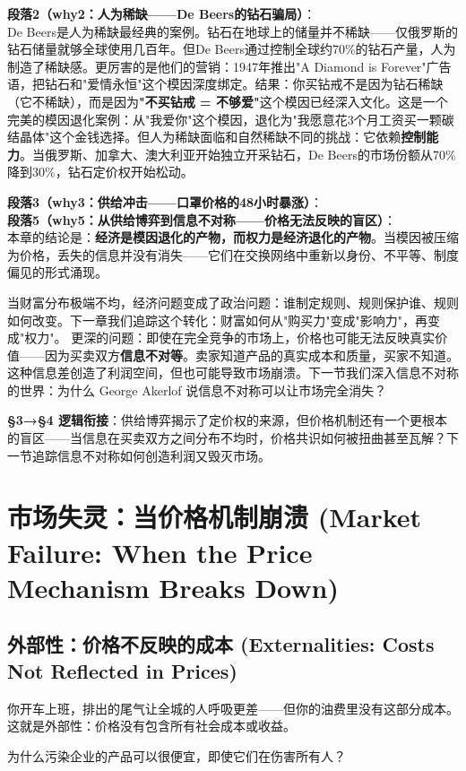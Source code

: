 \documentclass[../main.tex]{subfiles}
\begin{document}
	\textbf{段落2（why2：人为稀缺——De Beers的钻石骗局）}：\\
	De Beers是人为稀缺最经典的案例。钻石在地球上的储量并不稀缺——仅俄罗斯的钻石储量就够全球使用几百年。但De Beers通过控制全球约70\%的钻石产量，人为制造了稀缺感。更厉害的是他们的营销：1947年推出"A Diamond is Forever"广告语，把钻石和"爱情永恒"这个模因深度绑定。结果：你买钻戒不是因为钻石稀缺（它不稀缺），而是因为\textbf{"不买钻戒 = 不够爱"}这个模因已经深入文化。这是一个完美的模因退化案例：从"我爱你"这个模因，退化为"我愿意花3个月工资买一颗碳结晶体"这个金钱选择。但人为稀缺面临和自然稀缺不同的挑战：它依赖\textbf{控制能力}。当俄罗斯、加拿大、澳大利亚开始独立开采钻石，De Beers的市场份额从70\%降到30\%，钻石定价权开始松动。

	\textbf{段落3（why3：供给冲击——口罩价格的48小时暴涨）}：\\
	\textbf{段落5（why5：从供给博弈到信息不对称——价格无法反映的盲区）}：\\
	本章的结论是：\textbf{经济是模因退化的产物，而权力是经济退化的产物}。当模因被压缩为价格，丢失的信息并没有消失——它们在交换网络中重新以身份、不平等、制度偏见的形式涌现。

	当财富分布极端不均，经济问题变成了政治问题：谁制定规则、规则保护谁、规则如何改变。下一章我们追踪这个转化：财富如何从"购买力"变成"影响力"，再变成"权力"。
	更深的问题：即使在完全竞争的市场上，价格也可能无法反映真实价值——因为买卖双方\textbf{信息不对等}。卖家知道产品的真实成本和质量，买家不知道。这种信息差创造了利润空间，但也可能导致市场崩溃。下一节我们深入信息不对称的世界：为什么 George Akerlof 说信息不对称可以让市场完全消失？

	\textbf{§3→§4 逻辑衔接}：供给博弈揭示了定价权的来源，但价格机制还有一个更根本的盲区——当信息在买卖双方之间分布不均时，价格共识如何被扭曲甚至瓦解？下一节追踪信息不对称如何创造利润又毁灭市场。

	\section{市场失灵：当价格机制崩溃 (Market Failure: When the Price Mechanism Breaks Down)}

	\subsection{外部性：价格不反映的成本 (Externalities: Costs Not Reflected in Prices)}
	\begin{motivation}
		你开车上班，排出的尾气让全城的人呼吸更差——但你的油费里没有这部分成本。这就是外部性：价格没有包含所有社会成本或收益。
	\end{motivation}
	\begin{questionbox}
		为什么污染企业的产品可以很便宜，即使它们在伤害所有人？
	\end{questionbox}
\end{document}
